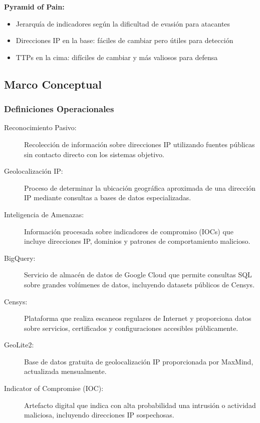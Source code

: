 \textbf{Pyramid of Pain:}
\begin{itemize}
    \item Jerarquía de indicadores según la dificultad de evasión para atacantes
    \item Direcciones IP en la base: fáciles de cambiar pero útiles para detección
    \item TTPs en la cima: difíciles de cambiar y más valiosos para defensa
\end{itemize}

\subsection{Marco Conceptual}

\subsubsection{Definiciones Operacionales}

\begin{description}
    \item[Reconocimiento Pasivo:] Recolección de información sobre direcciones IP utilizando fuentes públicas sin contacto directo con los sistemas objetivo.

    \item[Geolocalización IP:] Proceso de determinar la ubicación geográfica aproximada de una dirección IP mediante consultas a bases de datos especializadas.

    \item[Inteligencia de Amenazas:] Información procesada sobre indicadores de compromiso (IOCs) que incluye direcciones IP, dominios y patrones de comportamiento malicioso.

    \item[BigQuery:] Servicio de almacén de datos de Google Cloud que permite consultas SQL sobre grandes volúmenes de datos, incluyendo datasets públicos de Censys.

    \item[Censys:] Plataforma que realiza escaneos regulares de Internet y proporciona datos sobre servicios, certificados y configuraciones accesibles públicamente.

    \item[GeoLite2:] Base de datos gratuita de geolocalización IP proporcionada por MaxMind, actualizada mensualmente.

    \item[Indicator of Compromise (IOC):] Artefacto digital que indica con alta probabilidad una intrusión o actividad maliciosa, incluyendo direcciones IP sospechosas.
\end{description}

